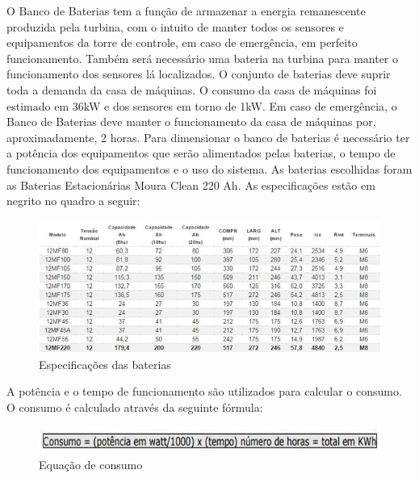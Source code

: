 O Banco de Baterias tem a função de armazenar a energia remanescente produzida pela turbina, com o intuito de manter todos os sensores e equipamentos da torre de controle, em caso de emergência, em perfeito funcionamento. Também será necessário uma bateria na turbina para manter o funcionamento dos sensores lá localizados.
O conjunto de baterias deve suprir toda a demanda da casa de máquinas. O consumo da casa de máquinas foi estimado em 36kW e dos sensores em torno de 1kW. Em caso de emergência, o Banco de Baterias deve manter o funcionamento da casa de máquinas por, aproximadamente, 2 horas.
 Para dimensionar o banco de baterias é necessário ter a potência dos equipamentos que serão alimentados pelas baterias, o tempo de funcionamento dos equipamentos e o uso do sistema. 
As baterias escolhidas foram as Baterias Estacionárias Moura Clean 220 Ah. As especificações estão em negrito no quadro a seguir:
\FloatBarrier
\begin{figure}[!ht]
\centering
\includegraphics[scale=0.7]{editaveis/figuras/bateria}
\caption[Especificações das baterias]{Especificações das baterias\footnotemark}

\label{bateria}
\end{figure}
\FloatBarrier

A potência e o tempo de funcionamento são utilizados para calcular o consumo. O consumo é calculado através da seguinte fórmula:
\FloatBarrier
\begin{figure}[!ht]
\centering
\includegraphics[scale=1]{editaveis/figuras/consumo}
\caption[Consumo]{Equação de consumo\footnotemark}
\label{consumo}
\end{figure}
\FloatBarrier

